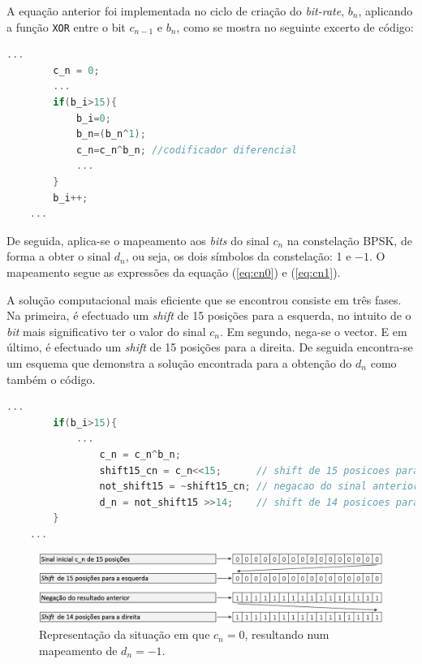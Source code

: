 \documentclass[11pt]{article}
\numberwithin{equation}{section}
\begin{document}
\vspace{1mm}
A equação anterior foi implementada no ciclo de criação do \textit{bit-rate}, $b_n$,  aplicando a função \texttt{XOR} entre o bit $c_{n-1}$ e $b_n$, como se mostra no seguinte excerto de código:

\begin{lstlisting}[language=C]
	...
		c_n = 0;
		...
		if(b_i>15){
			b_i=0;
			b_n=(b_n^1);
			c_n=c_n^b_n; //codificador diferencial
			...
		}
		b_i++;
	...
\end{lstlisting}
		
De seguida, aplica-se o mapeamento aos \textit{bits} do sinal $c_n$ na constelação BPSK, de forma a obter o sinal $d_n$, ou seja, os dois símbolos da constelação: 1 e $-1$. O mapeamento segue as expressões da equação (\ref{eq:cn0}) e (\ref{eq:cn1}).
	 
A solução computacional mais eficiente que se encontrou consiste em três fases. Na primeira, é efectuado um \textit{shift} de 15 posições para a esquerda, no intuito de o \textit{bit} mais significativo ter o valor do sinal $c_n$. Em segundo, nega-se o vector. E em último, é efectuado um \textit{shift} de 15 posições para a direita. De seguida encontra-se um esquema que demonstra a solução encontrada para a obtenção do $d_n$ como também o código.

\begin{lstlisting}[language=C]
	...
		if(b_i>15){
			...
				c_n = c_n^b_n;
				shift15_cn = c_n<<15;	   // shift de 15 posicoes para a esquerda
				not_shift15 = ~shift15_cn; // negacao do sinal anterior 
				d_n = not_shift15 >>14;    // shift de 14 posicoes para a direita
		}
	...
\end{lstlisting}


\begin{figure}[H]
	\centering
	\includegraphics[keepaspectratio=true, scale=0.30]{teoricas/esquema2}
	\caption{Representação da situação em que $c_{n} = 0$, resultando num mapeamento de $d_{n} = -1$.}
	\vspace{-0.8em}
\end{figure}
\end{document}
